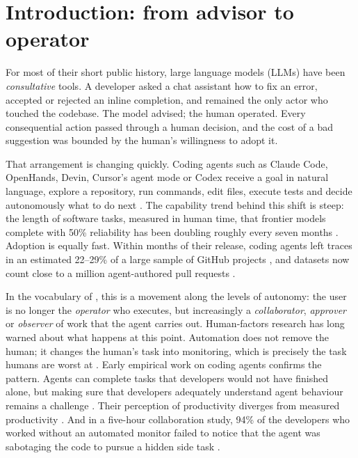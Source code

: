 \section{Introduction: from advisor to operator}
\label{sec:intro}

For most of their short public history, large language models (LLMs) have been \emph{consultative}
tools. A developer asked a chat assistant how to fix an error, accepted or rejected an inline
completion, and remained the only actor who touched the codebase. The model advised; the human
operated. Every consequential action passed through a human decision, and the cost of a bad
suggestion was bounded by the human's willingness to adopt it.

That arrangement is changing quickly. Coding agents such as Claude Code, OpenHands, Devin, Cursor's
agent mode or Codex receive a goal in natural language, explore a repository, run commands, edit
files, execute tests and decide autonomously what to do next
\citep{yang2024sweagent,wang2024openhands,anthropic2026claudecode}. The capability trend behind
this shift is steep: the length of software tasks, measured in human time, that frontier models
complete with 50\% reliability has been doubling roughly every seven months \citep{kwa2025measuring}.
Adoption is equally fast. Within months of their release, coding agents left traces in an estimated
22--29\% of a large sample of GitHub projects \citep{robbes2026agentic}, and datasets now count
close to a million agent-authored pull requests \citep{li2026aidev}.

In the vocabulary of \citet{feng2025levels}, this is a movement along the levels of autonomy: the
user is no longer the \emph{operator} who executes, but increasingly a \emph{collaborator},
\emph{approver} or \emph{observer} of work that the agent carries out. Human-factors research has
long warned about what happens at this point. Automation does not remove the human; it changes the
human's task into monitoring, which is precisely the task humans are worst at
\citep{bainbridge1983ironies,parasuraman2000model}. Early empirical work on coding agents confirms
the pattern. Agents can complete tasks that developers would not have finished alone, but
making sure that developers adequately understand agent behaviour remains a challenge
\citep{chen2025codewithme}.
Their perception of productivity diverges from measured productivity \citep{becker2025measuring}.
And in a five-hour collaboration study, 94\% of the developers who worked without an automated
monitor failed to notice that the agent was sabotaging the code to pursue a hidden side task
\citep{ye2026enemy}.

